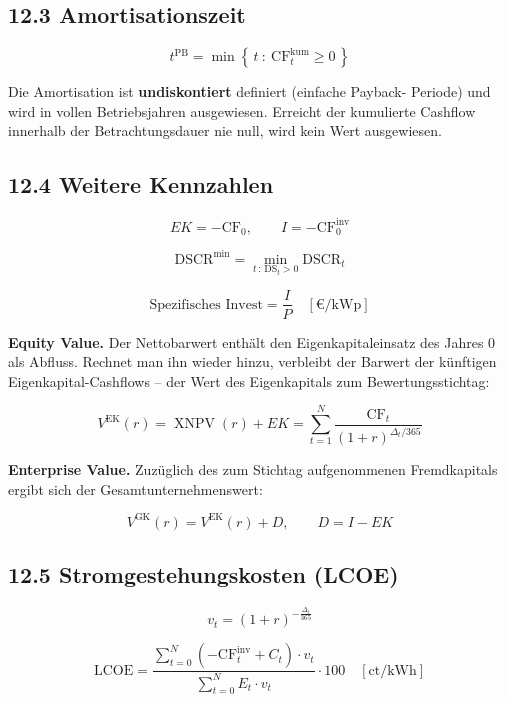 \documentclass[
  a4paper,
  10pt]{article}
\begin{document}
\hypertarget{amortisationszeit}{%
\subsection{12.3 Amortisationszeit}\label{amortisationszeit}}

\[ t^{\mathrm{PB}} = \min\left\{\,t \ :\ \mathrm{CF}^{\mathrm{kum}}_t \geq 0\,\right\} \]

Die Amortisation ist \textbf{undiskontiert} definiert (einfache Payback-
Periode) und wird in vollen Betriebsjahren ausgewiesen. Erreicht der
kumulierte Cashflow innerhalb der Betrachtungsdauer nie null, wird kein
Wert ausgewiesen.

\hypertarget{weitere-kennzahlen}{%
\subsection{12.4 Weitere Kennzahlen}\label{weitere-kennzahlen}}

\[ EK = -\mathrm{CF}_0, \qquad I = -\mathrm{CF}^{\mathrm{inv}}_0 \]

\[ \mathrm{DSCR}^{\min} = \min_{t\,:\,\mathrm{DS}_t > 0} \mathrm{DSCR}_t \]

\[ \text{Spezifisches Invest} = \frac{I}{P} \quad \left[\text{€/kWp}\right] \]

\textbf{Equity Value.} Der Nettobarwert enthält den Eigenkapitaleinsatz
des Jahres 0 als Abfluss. Rechnet man ihn wieder hinzu, verbleibt der
Barwert der künftigen Eigenkapital-Cashflows -- der Wert des
Eigenkapitals zum Bewertungsstichtag:

\[ V^{\mathrm{EK}}(r) = \operatorname{XNPV}(r) + EK = \sum_{t=1}^{N} \frac{\mathrm{CF}_t}{(1+r)^{\Delta_t/365}} \]

\textbf{Enterprise Value.} Zuzüglich des zum Stichtag aufgenommenen
Fremdkapitals ergibt sich der Gesamtunternehmenswert:

\[ V^{\mathrm{GK}}(r) = V^{\mathrm{EK}}(r) + D, \qquad D = I - EK \]

\hypertarget{stromgestehungskosten-lcoe}{%
\subsection{12.5 Stromgestehungskosten
(LCOE)}\label{stromgestehungskosten-lcoe}}

\[ v_t = (1 + r)^{-\frac{\Delta_t}{365}} \]

\[ \mathrm{LCOE} = \frac{\sum_{t=0}^{N} \left(-\mathrm{CF}^{\mathrm{inv}}_t + C_t\right) \cdot v_t}{\sum_{t=0}^{N} E_t \cdot v_t} \cdot 100 \quad \left[\text{ct/kWh}\right] \]
\end{document}

